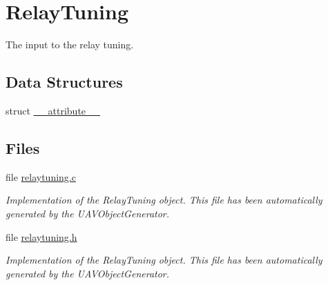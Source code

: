 \hypertarget{group___relay_tuning}{\section{\-Relay\-Tuning}
\label{group___relay_tuning}
}


\-The input to the relay tuning.  


\subsection*{\-Data \-Structures}
\begin{DoxyCompactItemize}
\item 
struct \hyperlink{struct____attribute____}{\-\_\-\-\_\-attribute\-\_\-\-\_\-}
\end{DoxyCompactItemize}
\subsection*{\-Files}
\begin{DoxyCompactItemize}
\item 
file \hyperlink{relaytuning_8c}{relaytuning.\-c}
\begin{DoxyCompactList}\small\item\em \-Implementation of the \-Relay\-Tuning object. \-This file has been automatically generated by the \-U\-A\-V\-Object\-Generator. \end{DoxyCompactList}\item 
file \hyperlink{relaytuning_8h}{relaytuning.\-h}
\begin{DoxyCompactList}\small\item\em \-Implementation of the \-Relay\-Tuning object. \-This file has been automatically generated by the \-U\-A\-V\-Object\-Generator. \end{DoxyCompactList}\end{DoxyCompactItemize}
